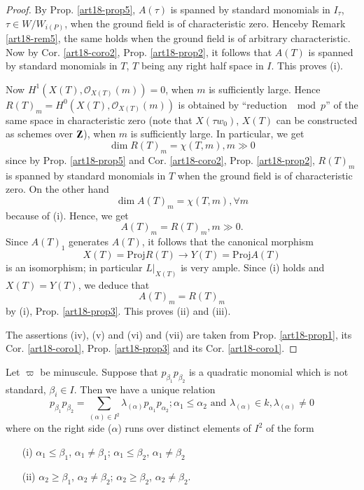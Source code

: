 \begin{proof}
By Prop. \ref{art18-prop5}, $A(\tau)$ is spanned by standard monomials in $I_\tau$, $\tau \in W / W_{i(P)}$, when the ground field is of characteristic zero. Hence\pageoriginale by Remark \ref{art18-rem5}, the same holds when the ground field is of arbitrary characteristic. Now by Cor. \ref{art18-coro2}, Prop. \ref{art18-prop2}, it follows that $A(T)$ is spanned by standard monomials in $T$, $T$ being any right half space in $I$. This proves (i).

Now $H^1 (X(T), \mathscr{O}_{X(T)}(m))=0$, when $m$ is sufficiently large. Hence $R(T)_m = H^0 (X(T), \mathscr{O}_{X(T)}(m))$ is obtained by ``reduction $\mod p$'' of the same space in characteristic zero (note that $X(\tau w_0)$, $X(T)$ can be constructed as schemes over $\mathbf{Z}$), when $m$ is sufficiently large. In particular, we get
$$
\dim R(T)_m = \chi (T,m) , m \gg 0
$$
since by Prop. \ref{art18-prop5} and Cor. \ref{art18-coro2}, Prop. \ref{art18-prop2}, $R(T)_m$ is spanned by standard monomials in $T$ when the ground field is of characteristic zero. On the other hand 
$$
\dim A(T)_m = \chi (T, m), \forall m
$$
because of (i). Hence, we get 
$$
A(T)_m = R (T)_m, m \gg 0.
$$
Since $A(T)_1$ generates $A(T)$, it follows that the canonical morphism
$$
X(T) = \text{Proj} R(T) \to Y(T) = \text{Proj} A(T)
$$
is an isomorphism; in particular $L|_{X(T)}$ is very ample. Since (i) holds and $X(T) = Y (T)$, we deduce that 
$$
A(T)_m = R(T)_m
$$
by (i), Prop. \ref{art18-prop3}. This proves (ii) and (iii).


The assertions (iv), (v) and (vi) and (vii) are taken from Prop. \ref{art18-prop1}, its Cor. \ref{art18-coro1}, Prop. \ref{art18-prop3} and its Cor. \ref{art18-coro1}.
\end{proof}
\setcounter{coro}{0}
\begin{coro}%
Let $\varpi$ be minuscule. Suppose that $p_{\beta_1} p_{\beta_2}$ is a quadratic monomial which is not standard, $\beta_i \in I$. Then we have a unique relation
\begin{equation*}
p_{\beta_1} p_{\beta_2} = \sum\limits_{(\alpha ) \in I^2} \lambda_{(\alpha)} p_{\alpha_1} p_{\alpha_2}; \alpha_1 \leqslant \alpha_2 \text{ and } \lambda_{(\alpha)} \in k, \lambda_{(\alpha)} \neq 0 \tag{*}
\end{equation*}
where on the right side ($\alpha$) runs over distinct elements of $I^2$ of the form 
\begin{itemize}
\item[\rm (i)] $\alpha_1 \leqslant \beta_1$, $\alpha_1 \neq \beta_1$; $\alpha_1 \leqslant \beta_2$, $\alpha_1 \neq \beta_2$\pageoriginale 

\item[\rm (ii)] $\alpha_2 \geqslant \beta_1$, $\alpha_2 \neq \beta_2$; $\alpha_2 \geqslant \beta_2$, $\alpha_2 \neq \beta_2$.
\end{itemize}
\end{coro}

